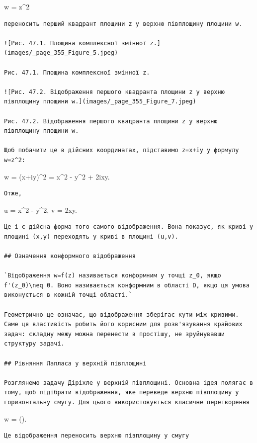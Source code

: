 \documentclass[
  ukrainian,
]{article}
\begin{document}
w = z\^{}2

\begin{verbatim}
переносить перший квадрант площини z у верхню півплощину площини w.

![Рис. 47.1. Площина комплексної змінної z.](images/_page_355_Figure_5.jpeg)

Рис. 47.1. Площина комплексної змінної z.

![Рис. 47.2. Відображення першого квадранта площини z у верхню півплощину площини w.](images/_page_355_Figure_7.jpeg)

Рис. 47.2. Відображення першого квадранта площини z у верхню півплощину площини w.

Щоб побачити це в дійсних координатах, підставимо z=x+iy у формулу w=z^2:
\end{verbatim}

w = (x+iy)\^{}2 = x\^{}2 - y\^{}2 + 2ixy.

\begin{verbatim}
Отже,
\end{verbatim}

u = x\^{}2 - y\^{}2, \qquad v = 2xy.

\begin{verbatim}
Це і є дійсна форма того самого відображення. Вона показує, як криві у площині (x,y) переходять у криві в площині (u,v).

## Означення конформного відображення

`Відображення w=f(z) називається конформним у точці z_0, якщо f'(z_0)\neq 0. Воно називається конформним в області D, якщо ця умова виконується в кожній точці області.`

Геометрично це означає, що відображення зберігає кути між кривими. Саме ця властивість робить його корисним для розв'язування крайових задач: складну межу можна перенести в простішу, не зруйнувавши структуру задачі.

## Рівняння Лапласа у верхній півплощині

Розглянемо задачу Діріхле у верхній півплощині. Основна ідея полягає в тому, щоб підібрати відображення, яке переведе верхню півплощину у горизонтальну смугу. Для цього використовується класичне перетворення
\end{verbatim}

w = \ln\left(\right).

\begin{verbatim}
Це відображення переносить верхню півплощину у смугу
\end{verbatim}
\end{document}
